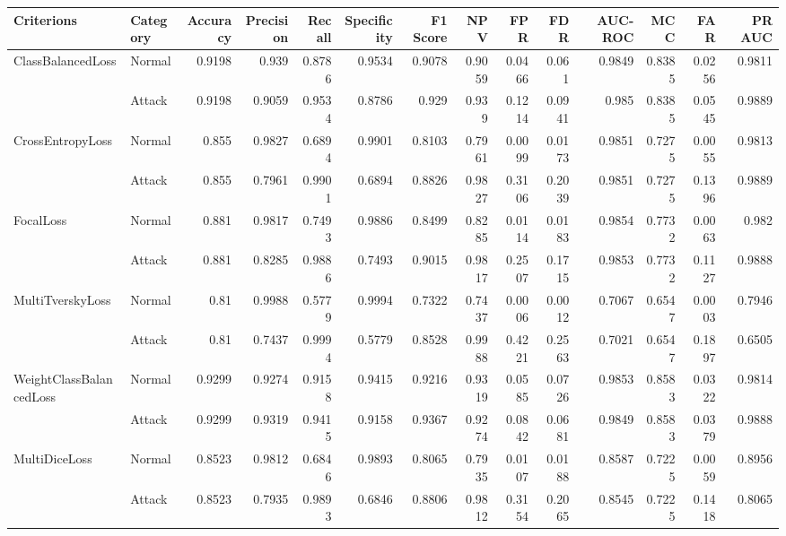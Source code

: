 \begin{tabular}{llrrrrrrrrrrrr}
\hline
 Criterions              & Category   &   Accuracy &   Precision &   Recall &   Specificity &   F1 Score &    NPV &    FPR &    FDR &   AUC-ROC &    MCC &    FAR &   PR AUC \\
\hline
 ClassBalancedLoss       & Normal     &     0.9198 &      0.939  &   0.8786 &        0.9534 &     0.9078 & 0.9059 & 0.0466 & 0.061  &    0.9849 & 0.8385 & 0.0256 &   0.9811 \\
                         & Attack     &     0.9198 &      0.9059 &   0.9534 &        0.8786 &     0.929  & 0.939  & 0.1214 & 0.0941 &    0.985  & 0.8385 & 0.0545 &   0.9889 \\
 CrossEntropyLoss        & Normal     &     0.855  &      0.9827 &   0.6894 &        0.9901 &     0.8103 & 0.7961 & 0.0099 & 0.0173 &    0.9851 & 0.7275 & 0.0055 &   0.9813 \\
                         & Attack     &     0.855  &      0.7961 &   0.9901 &        0.6894 &     0.8826 & 0.9827 & 0.3106 & 0.2039 &    0.9851 & 0.7275 & 0.1396 &   0.9889 \\
 FocalLoss               & Normal     &     0.881  &      0.9817 &   0.7493 &        0.9886 &     0.8499 & 0.8285 & 0.0114 & 0.0183 &    0.9854 & 0.7732 & 0.0063 &   0.982  \\
                         & Attack     &     0.881  &      0.8285 &   0.9886 &        0.7493 &     0.9015 & 0.9817 & 0.2507 & 0.1715 &    0.9853 & 0.7732 & 0.1127 &   0.9888 \\
 MultiTverskyLoss        & Normal     &     0.81   &      0.9988 &   0.5779 &        0.9994 &     0.7322 & 0.7437 & 0.0006 & 0.0012 &    0.7067 & 0.6547 & 0.0003 &   0.7946 \\
                         & Attack     &     0.81   &      0.7437 &   0.9994 &        0.5779 &     0.8528 & 0.9988 & 0.4221 & 0.2563 &    0.7021 & 0.6547 & 0.1897 &   0.6505 \\
 WeightClassBalancedLoss & Normal     &     0.9299 &      0.9274 &   0.9158 &        0.9415 &     0.9216 & 0.9319 & 0.0585 & 0.0726 &    0.9853 & 0.8583 & 0.0322 &   0.9814 \\
                         & Attack     &     0.9299 &      0.9319 &   0.9415 &        0.9158 &     0.9367 & 0.9274 & 0.0842 & 0.0681 &    0.9849 & 0.8583 & 0.0379 &   0.9888 \\
 MultiDiceLoss           & Normal     &     0.8523 &      0.9812 &   0.6846 &        0.9893 &     0.8065 & 0.7935 & 0.0107 & 0.0188 &    0.8587 & 0.7225 & 0.0059 &   0.8956 \\
                         & Attack     &     0.8523 &      0.7935 &   0.9893 &        0.6846 &     0.8806 & 0.9812 & 0.3154 & 0.2065 &    0.8545 & 0.7225 & 0.1418 &   0.8065 \\
\hline
\end{tabular}